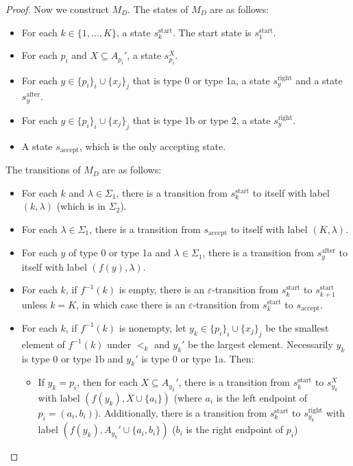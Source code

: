 \documentclass{article}
\begin{document}
\begin{proof}
Now we construct $M_D$. The states of $M_D$ are as follows:
\begin{itemize}
    \item For each $k\in \{1,\dots,K\}$, a state $s_k^{\text{start}}$. The start state is $s_1^{\text{start}}$.
    \item For each $p_i$ and $X\subseteq A_{p_i}'$, a state $s_{p_i}^X$.
    \item For each $y\in \{p_i\}_i\cup \{x_j\}_j$ that is type 0 or type 1a, a state $s_y^{\text{right}}$ and a state $s_y^{\text{after}}$.
    \item For each $y\in \{p_i\}_i\cup \{x_j\}_j$ that is type 1b or type 2, a state $s_y^{\text{right}}$.
    \item A state $s_{\text{accept}}$, which is the only accepting state.
\end{itemize}
The transitions of $M_D$ are as follows:
\begin{itemize}
    \item For each $k$ and $\lambda\in\Sigma_1$, there is a transition from $s_k^{\text{start}}$ to itself with label $(k, \lambda)$ (which is in $\Sigma_2$).
    \item For each $\lambda\in\Sigma_1$, there is a transition from $s_{\text{accept}}$ to itself with label $(K, \lambda)$.
    \item For each $y$ of type 0 or type 1a and $\lambda\in \Sigma_1$, there is a transition from $s_y^{\text{after}}$ to itself with label $(f(y), \lambda)$.
    \item For each $k$, if $f^{-1}(k)$ is empty, there is an $\varepsilon$-transition from $s_k^{\text{start}}$ to $s_{k+1}^{\text{start}}$ unless $k=K$, in which case there is an $\varepsilon$-transition from $s_k^{\text{start}}$ to $s_{\text{accept}}$.
    \item For each $k$, if $f^{-1}(k)$ is nonempty, let $y_k\in \{p_i\}_i\cup \{x_j\}_j$ be the smallest element of $f^{-1}(k)$ under $<_k$ and $y_k'$ be the largest element. Necessarily $y_k$ is type 0 or type 1b and $y_k'$ is type 0 or type 1a. Then:
    \begin{itemize}
        \item If $y_k=p_i$, then for each $X\subseteq A_{y_k}'$, there is a transition from $s_k^{\text{start}}$ to $s_{y_k}^X$ with label $(f(y_k), X\cup \{a_i\})$ (where $a_i$ is the left endpoint of $p_i=(a_i,b_i)$). Additionally, there is a transition from $s_k^{\text{start}}$ to $s_{y_k}^{\text{right}}$ with label $(f(y_k), A_{y_k}'\cup \{a_i, b_i\})$ ($b_i$ is the right endpoint of $p_i$)

\end{itemize}
\end{itemize}
\end{proof}
\end{document}
